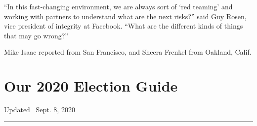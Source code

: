 ``In this fast-changing environment, we are always sort of `red teaming'
and working with partners to understand what are the next risks?'' said
Guy Rosen, vice president of integrity at Facebook. ``What are the
different kinds of things that may go wrong?''

Mike Isaac reported from San Francisco, and Sheera Frenkel from Oakland,
Calif.

\hypertarget{our-2020-election-guide}{%
\section{Our 2020 Election Guide}\label{our-2020-election-guide}}

Updated ~Sept. 8, 2020

\begin{center}\rule{0.5\linewidth}{\linethickness}\end{center}

